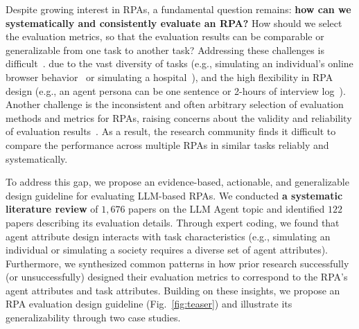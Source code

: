 Despite growing interest in RPAs, a fundamental question remains: \textbf{how can we systematically and consistently evaluate an RPA?}
How should we select the evaluation metrics, so that the evaluation results can be comparable or generalizable from one task to another task?
Addressing these challenges is difficult~\cite{dai2024mmrole, tu2024charactereval, wang2024incharacter}. 
due to the vast diversity of tasks (e.g., simulating an individual's online browser behavior~\cite{10.1145/3613904.3642363} or simulating a hospital~\cite{li2024agent}), and the high flexibility in RPA design (e.g., an agent persona can be one sentence or 2-hours of interview log~\cite{park2024generativeagentsimulations1000}).
Another challenge is the inconsistent and often arbitrary selection of evaluation methods and metrics for RPAs, raising concerns about the validity and reliability of evaluation results~\cite{wang2025limits, zhang2025simulation}.
As a result, the research community finds it difficult to compare the performance across multiple RPAs in similar tasks reliably and systematically.


To address this gap, we propose an evidence-based, actionable, and generalizable design guideline for evaluating LLM-based RPAs. We conducted \textbf{a systematic literature review} of $1,676$ papers on the LLM Agent topic and identified $122$ papers describing its evaluation details. 
Through expert coding, we found that agent attribute design interacts with task characteristics (e.g., simulating an individual or simulating a society requires a diverse set of agent attributes). 
Furthermore, we synthesized common patterns in how prior research successfully (or unsuccessfully) designed their evaluation metrics to correspond to the RPA's agent attributes and task attributes. 
Building on these insights, we propose an RPA evaluation design guideline (Fig.~\ref{fig:teaser}) and illustrate its generalizability through two case studies. 

